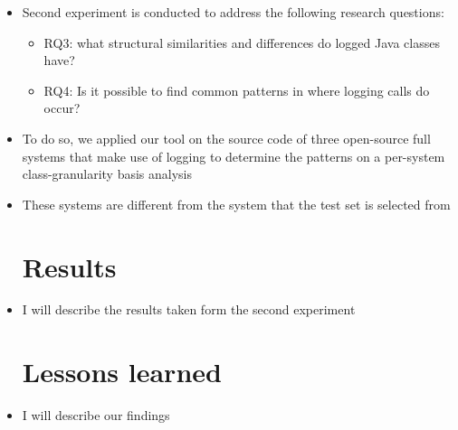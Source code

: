 \begin{itemize} [leftmargin=.01in]
\section{Experiment 2}  \label{expr2}
\item Second experiment is conducted to address the following research questions:
\begin{itemize} [leftmargin=.3in]
\item \textsc{RQ3: }what structural similarities and differences do logged Java classes have?
\item \textsc{RQ4: }Is it possible to find common patterns in where logging calls do occur?
\end{itemize}
\item To do so, we applied our tool on the source code of three open-source full systems that make use of logging to determine the patterns on a per-system class-granularity basis analysis
\item These systems are different from the system that the test set is selected from
\section{Results}  \label{results2}
\item I will describe the results taken form the second experiment
\section{Lessons learned}  \label{lessons}
\item I will describe our findings
\end{itemize}